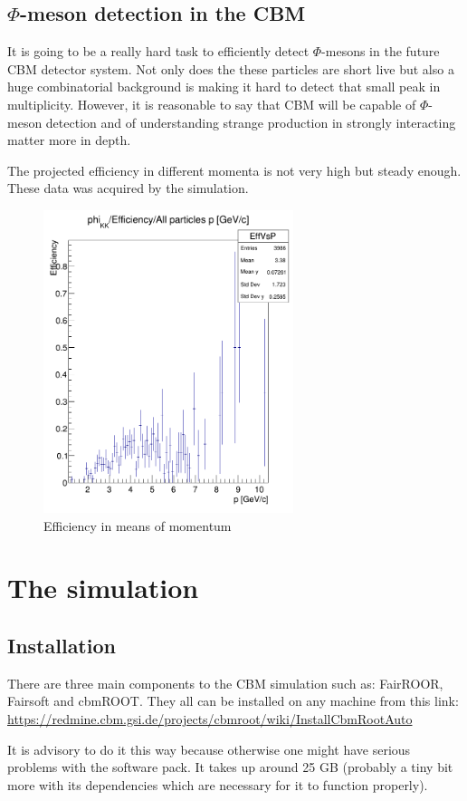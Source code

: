 \documentclass[a4paper,12pt]{article}
\begin{document}
\subsection{$\Phi$-meson detection in the CBM}
\vspace{5mm}
\par It is going to be a really hard task to efficiently detect $\Phi$-mesons in the future CBM detector system. Not only
 does the these particles are short live but also a huge combinatorial background is making it hard to detect that small peak
  in multiplicity. However, it is reasonable to say that CBM will be capable of $\Phi$-meson detection and of understanding strange
   production in strongly interacting matter more in depth.
\vspace{5mm}
\par The projected efficiency in different momenta is not very high but steady enough. These data was acquired by the simulation. 
\begin{figure}[H]
	\centering
	\includegraphics[width=0.65\textwidth]{efficieny.png}
	\caption{ Efficiency in means of momentum }
\end{figure}
\section{ The simulation}
\vspace{3mm}
\subsection{ Installation}
\vspace{5mm}
\par There are three main components to the CBM simulation such as: FairROOR, Fairsoft and cbmROOT. They all can be installed
 on any machine from this link:
\url{https://redmine.cbm.gsi.de/projects/cbmroot/wiki/InstallCbmRootAuto} \newline
\par It is advisory to do it this way because otherwise one might have serious problems with the software pack. It takes up
around 25 GB (probably a tiny bit more with its dependencies which are necessary for it to function properly).
\end{document}
